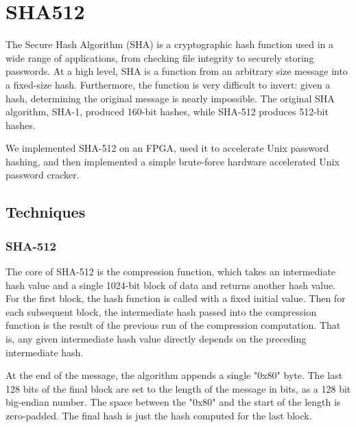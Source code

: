 \section{SHA512}
The Secure Hash Algorithm (SHA) is a cryptographic hash function used in a wide range of applications, from checking
file integrity to securely storing passwords.
At a high level, SHA is a function from an arbitrary size message into a fixed-size hash.
Furthermore, the function is very difficult to invert: given a hash, determining the original
message is nearly impossible.
The original SHA algorithm, SHA-1, produced 160-bit hashes, while SHA-512
produces 512-bit hashes.

We implemented SHA-512 on an FPGA, used it to accelerate Unix password hashing, and then implemented
a simple brute-force hardware accelerated Unix password cracker.

\subsection{Techniques}
\subsubsection{SHA-512}
The core of SHA-512 is the compression function, which takes an intermediate hash value and a single 1024-bit
block of data and returns another hash value.
For the first block, the hash function is called with a fixed initial value. Then for each subsequent
block, the intermediate hash passed into the compression function is the result of the previous run of the
compression computation. That is, any given intermediate hash value directly depends on the preceding
intermediate hash.

At the end of the message, the algorithm appends a single "0x80" byte. The last 128 bits of the final block
are set to the length of the message in bits, as a 128 bit big-endian number. The space between the "0x80" and
the start of the length is zero-padded.
The final hash is just the hash computed for the last block.


